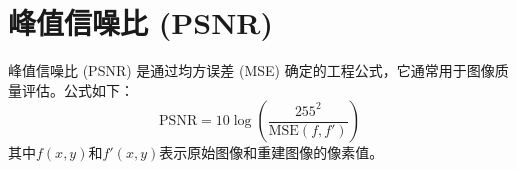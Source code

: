 \section{峰值信噪比 (PSNR)}

峰值信噪比 (PSNR) 是通过均方误差 (MSE) 确定的工程公式，它通常用于图像质量评估。公式如下\citep{xiao2009analysis}：
\begin{equation}
    \text{PSNR}=10\log \left(\frac{255^2}{\text{MSE}(f,f')}\right)
\end{equation}
其中$f(x,y)$和$f'(x,y)$表示原始图像和重建图像的像素值。